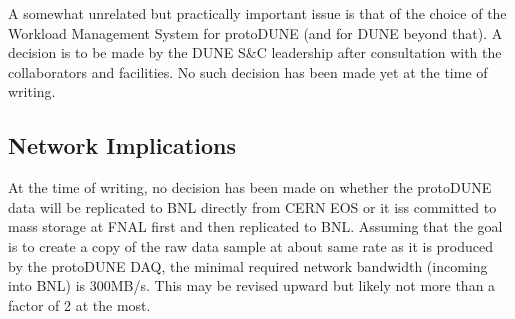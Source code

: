 \documentclass[pdftex,12pt,letter]{article}
\begin{document}
A somewhat unrelated but practically important issue is that of the choice of the Workload Management System for protoDUNE
(and for DUNE beyond that).
A decision is to be made by the DUNE S\&C leadership after consultation with the collaborators and facilities. No such decision has
been made yet at the time of writing.

\subsection{Network Implications}
At the time of writing, no decision has been made on whether the protoDUNE data will be replicated to BNL directly from CERN
EOS  or it iss committed to mass storage at FNAL first and then replicated to BNL. Assuming that the goal is to create a copy of
the raw data sample at about same rate as it is produced by the protoDUNE DAQ, the minimal required network bandwidth (incoming into
BNL) is 300MB/s. This may be revised upward but likely not more than a factor of 2 at the most.
\end{document}
